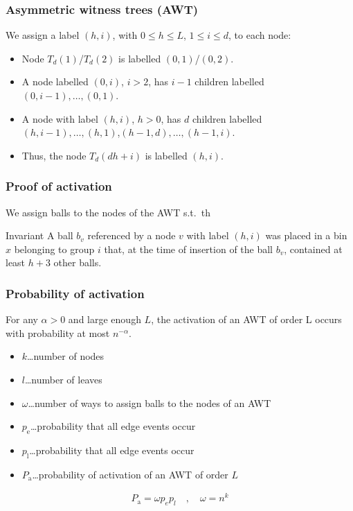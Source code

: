 \documentclass[serif,professionalfonts]{beamer}
\begin{document}
\begin{frame}[shrink]
\frametitle{Asymmetric witness trees (AWT)} 
We assign a label $(h,i)$, with $0\leq h \leq L$, $1\leq i \leq d$, to each node:
\begin{itemize}
\item Node $T_d(1)$/$T_d(2)$ is labelled $(0,1)$/$(0,2)$.
\item A node labelled $(0,i)$, $i>2$, has $i-1$ children labelled $(0,i-1),\dots,(0,1)$.
\item A node with label $(h,i)$, $h>0$, has $d$ children labelled
$(h,i-1),\dots,(h,1)$,$(h-1,d),\dots,(h-1, i)$.
\item Thus, the node $T_d(dh+i)$ is labelled $(h,i)$.
\end{itemize}
\begin{center}
\end{center}
\end{frame}

\begin{frame}
\frametitle{Proof of activation}
We assign balls to the nodes of the AWT s.t.~th

\begin{exampleblock}{Invariant}
A ball $b_v$ referenced by a node $v$ with label $(h,i)$ was placed in a bin $x$ belonging to group $i$ that, at the time of insertion of the ball $b_v$, contained at least $h+3$ other balls. 
\end{exampleblock}

\end{frame}

\begin{frame}
\frametitle{Probability of activation}
\begin{lemma}
For any $\alpha > 0$ and large enough $L$, the activation of an AWT of order L occurs with probability at most $n^{-\alpha}$.
\end{lemma}

\bigskip
\begin{itemize}
\item $k$\dots number of nodes
\item $l$\dots number of leaves
\item $\omega$\dots number of ways to assign balls to the nodes of an AWT
\item $p_\mathrm{e}$\dots probability that all edge events occur
\item $p_\mathrm{l}$\dots probability that all edge events occur
\item $P_\mathrm{a}$\dots probability of activation of an AWT of order $L$
\end{itemize}

\begin{align*}
P_\mathrm{a} = \omega p_e p_l \quad , \quad \omega = n^k 
\end{align*}
\end{frame}
\end{document}
